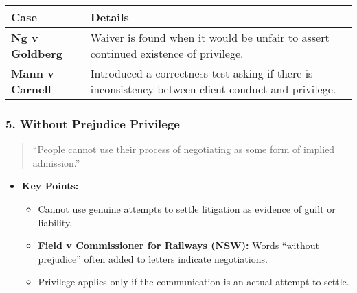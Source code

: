 \begin{longtable}[]{@{}
  >{\raggedright\arraybackslash}p{}
  >{\raggedright\arraybackslash}p{}@{}}
\toprule\noalign{}
\begin{minipage}[b]{\linewidth}\raggedright
\textbf{Case}
\end{minipage} & \begin{minipage}[b]{\linewidth}\raggedright
\textbf{Details}
\end{minipage} \\
\midrule\noalign{}
\endhead
\bottomrule\noalign{}
\endlastfoot
\textbf{Ng v Goldberg} & Waiver is found when it would be unfair to
assert continued existence of privilege. \\
\textbf{Mann v Carnell} & Introduced a correctness test asking if there
is inconsistency between client conduct and privilege. \\
\end{longtable}

\subsubsection{\texorpdfstring{5. \textbf{Without Prejudice
Privilege}}{5. Without Prejudice Privilege}}\label{without-prejudice-privilege}

\begin{quote}
``People cannot use their process of negotiating as some form of implied
admission.''
\end{quote}

\begin{itemize}
\tightlist
\item
  \textbf{Key Points:}

  \begin{itemize}
  \tightlist
  \item
    Cannot use genuine attempts to settle litigation as evidence of
    guilt or liability.
  \item
    \textbf{Field v Commissioner for Railways (NSW):} Words ``without
    prejudice'' often added to letters indicate negotiations.
  \item
    Privilege applies only if the communication is an actual attempt to
    settle.
  \end{itemize}
\end{itemize}

